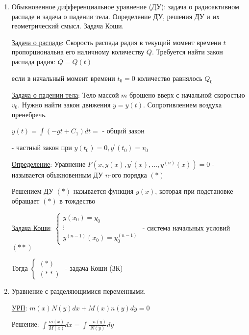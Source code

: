 \documentclass[12pt]{article}
\begin{document}
    \begin{enumerate}
        \item Обыкновенное дифференциальное уравнение (ДУ): задача о радиоактивном распаде и задача о падении тела. Определение ДУ, решения ДУ и их геометрический смысл. Задача Коши.

        \hyperlink{radiumproblem}{Задача о распаде}: Скорость распада радия в текущий момент времени $t$ пропорциональна его наличному количеству $Q$. Требуется найти закон распада радия: $Q = Q(t)$

        если в начальный момент времени $t_0 = 0$ количество равнялось $Q_0$


        \hyperlink{freefallingbodyproblem}{Задача о падении тела}: Тело массой $m$ брошено вверх с начальной скоростью $v_0$. Нужно найти закон движения $y = y(t)$.
        Сопротивлением воздуха пренебречь.

        $y(t) = \int (-gt + C_1) dt = $ - общий закон

         - частный закон при $y(t_0) = 0, y^\prime(t_0) = v_0$

        \hyperlink{differentialequationdefinition}{Определение}: Уравнение $F(x, y(x), y^\prime(x), \dots, y^{(n)}(x)) = 0$ - называется обыкновенным ДУ $n$-ого порядка $(*)$

        Решением ДУ $(*)$ называется функция $y(x)$, которая при подстановке обращает $(*)$ в тождество

        \hyperlink{problemCauchy}{Задача Коши}: $\begin{cases}y(x_0) = y_0 \\ \vdots \\ y^{(n - 1)}(x_0) = y_0^{(n - 1)}\end{cases}$ - система начальных условий $(**)$

        Тогда $\begin{cases}(*) \\ (**)\end{cases}$ - задача Коши (ЗК)

        \item Уравнение с разделяющимися переменными.

        \hyperlink{equationwithseparablevariables}{УРП}: $m(x)N(y)dx + M(x)n(y)dy = 0$

        Решение: $\int \frac{m(x)}{M(x)}dx = \int\frac{-n(y)}{N(y)}dy$


\end{enumerate}
\end{document}
